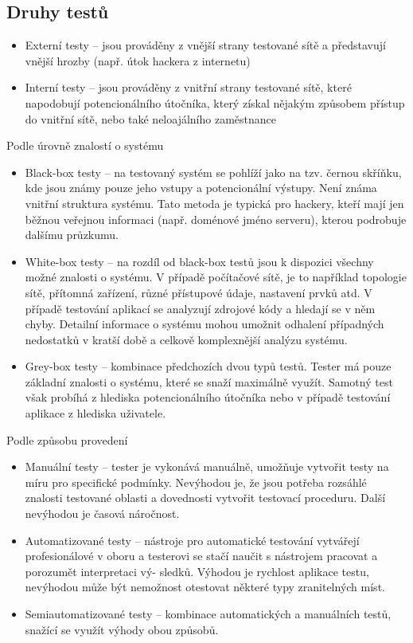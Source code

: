 \documentclass{article}
\begin{document}
\subsection{Druhy testů}
\begin{itemize}  
\item Externí testy – jsou prováděny z vnější strany testované sítě a představují vnější hrozby
(např. útok hackera z internetu)
\item Interní testy – jsou prováděny z vnitřní strany testované sítě, které napodobují potencionálního
útočníka, který získal nějakým způsobem přístup do vnitřní sítě, nebo také
neloajálního zaměstnance
\end{itemize}
Podle úrovně znalostí o systému
\begin{itemize}  
\item Black-box testy – na testovaný systém se pohlíží jako na tzv. černou skříňku, kde jsou
známy pouze jeho vstupy a potencionální výstupy. Není známa vnitřní struktura systému.
Tato metoda je typická pro hackery, kteří mají jen běžnou veřejnou informaci (např. doménové
jméno serveru), kterou podrobuje dalšímu průzkumu.
\item White-box testy – na rozdíl od black-box testů jsou k dispozici všechny možné znalosti
o systému. V případě počítačové sítě, je to například topologie sítě, přítomná zařízení,
různé přístupové údaje, nastavení prvků atd. V případě testování aplikací se analyzují
zdrojové kódy a hledají se v něm chyby. Detailní informace o systému mohou umožnit
odhalení případných nedostatků v kratší době a celkově komplexnější analýzu systému.
\item Grey-box testy – kombinace předchozích dvou typů testů. Tester má pouze základní
znalosti o systému, které se snaží maximálně využít. Samotný test však probíhá z hlediska
potencionálního útočníka nebo v případě testování aplikace z hlediska uživatele.
\end{itemize}
Podle způsobu provedení
\begin{itemize}  
\item Manuální testy – tester je vykonává manuálně, umožňuje vytvořit testy na míru pro specifické
podmínky. Nevýhodou je, že jsou potřeba rozsáhlé znalosti testované oblasti a dovednosti
vytvořit testovací proceduru. Další nevýhodou je časová náročnost.
\item Automatizované testy – nástroje pro automatické testování vytvářejí profesionálové
v oboru a testerovi se stačí naučit s nástrojem pracovat a porozumět interpretaci vý-
sledků. Výhodou je rychlost aplikace testu, nevýhodou může být nemožnost otestovat
některé typy zranitelných míst.
\item Semiautomatizované testy – kombinace automatických a manuálních testů, snažící se
využít výhody obou způsobů.
\end{itemize}
\end{document}
